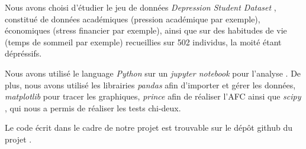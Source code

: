 Nous avons choisi d'étudier le jeu de données \textit{Depression Student Dataset} \citep{dataset}, constitué de données académiques (pression académique par exemple), économiques (stress financier par exemple), ainsi que sur des habitudes de vie (temps de sommeil par exemple) recueillies sur 502 individus, la moité étant dépréssifs. 

Nous avons utilisé le language \textit{Python} \citep{python} sur un \textit{jupyter notebook} \citep{jupyter} pour l'analyse . De plus, nous avons utilisé les librairies \textit{pandas} \citep{pandas} afin d'importer et gérer les données, \textit{matplotlib} \citep{matplotlib} pour tracer les graphiques, \textit{prince} \citep{prince} afin de réaliser l'AFC ainsi que \textit{scipy} \citep{scipy}, qui nous a permis de réaliser les tests chi-deux.

Le code écrit dans le cadre de notre projet est trouvable sur le dépôt github du projet \citep{repo}.
